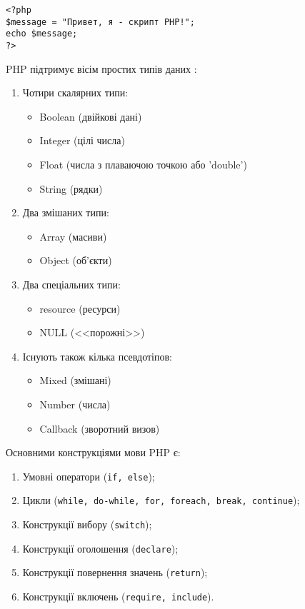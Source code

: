 \begin{verbatim}
<?php
$message = "Привет, я - скрипт PHP!";
echo $message;
?>
\end{verbatim}
PHP підтримує вісім простих типів даних \label{datatypes}:
\begin{enumerate}
\item Чотири скалярних типи:
		\begin{itemize}
		\item Boolean (двійкові дані)
		\item Integer (цілі числа)
		\item Float (числа з плаваючою точкою або 'double')
		\item String (рядки)
		\end{itemize}
\item Два змішаних типи:
		\begin{itemize}
		\item Array (масиви)
		\item Object (об'єкти)
		\end{itemize}
\item Два спеціальних типи:
		\begin{itemize}
		\item resource (ресурси)
		\item NULL (<<порожні>>)
		\end{itemize}
\item Існують також кілька псевдотіпов:
		\begin{itemize}
		\item Mixed (змішані)
		\item Number (числа)
		\item Callback (зворотний визов)		
		\end{itemize}
\end{enumerate}

Основними конструкціями мови PHP є:
\begin{enumerate}
\item Умовні оператори (\verb|if, else|);
\item Цикли (\verb|while, do-while, for, foreach, break, continue|);
\item Конструкції вибору (\verb|switch|);
\item Конструкції оголошення (\verb|declare|);
\item Конструкції повернення значень (\verb|return|);
\item Конструкції включень (\verb|require, include|).
\end{enumerate}


